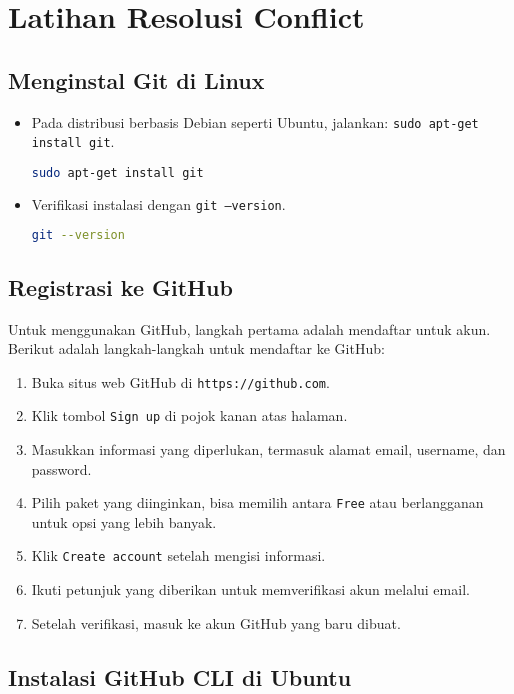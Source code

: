 \chapter{Latihan Resolusi Conflict}

\section{Menginstal Git di Linux}
\begin{itemize}
	\item Pada distribusi berbasis Debian seperti Ubuntu, jalankan: \texttt{sudo apt-get install git}.
	\begin{lstlisting}[language=bash]
		sudo apt-get install git
	\end{lstlisting}
	\item Verifikasi instalasi dengan \texttt{git --version}.
	\begin{lstlisting}[language=bash]
		git --version
	\end{lstlisting}
\end{itemize}

\section{Registrasi ke GitHub}

Untuk menggunakan GitHub, langkah pertama adalah mendaftar untuk akun. Berikut adalah langkah-langkah untuk mendaftar ke GitHub:

\begin{enumerate}
	\item Buka situs web GitHub di \texttt{https://github.com}.
	\item Klik tombol \texttt{Sign up} di pojok kanan atas halaman.
	\item Masukkan informasi yang diperlukan, termasuk alamat email, username, dan password.
	\item Pilih paket yang diinginkan, bisa memilih antara \texttt{Free} atau berlangganan untuk opsi yang lebih banyak.
	\item Klik \texttt{Create account} setelah mengisi informasi.
	\item Ikuti petunjuk yang diberikan untuk memverifikasi akun melalui email.
	\item Setelah verifikasi, masuk ke akun GitHub yang baru dibuat.
\end{enumerate}

\section{Instalasi GitHub CLI di Ubuntu}

